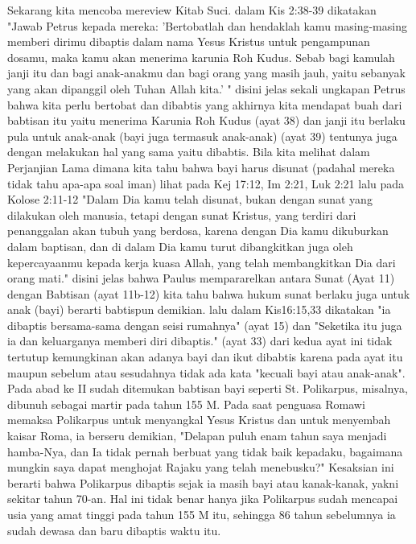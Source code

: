         Sekarang kita mencoba mereview Kitab Suci. dalam Kis 2:38-39 dikatakan "Jawab Petrus kepada mereka: 'Bertobatlah dan hendaklah kamu masing-masing memberi dirimu dibaptis dalam nama Yesus Kristus untuk pengampunan dosamu, maka kamu akan menerima karunia Roh Kudus. Sebab bagi kamulah janji itu dan bagi anak-anakmu dan bagi orang yang masih jauh, yaitu sebanyak yang akan dipanggil oleh Tuhan Allah kita.' " disini jelas sekali ungkapan Petrus bahwa kita perlu bertobat dan dibabtis yang akhirnya kita mendapat buah dari babtisan itu yaitu menerima Karunia Roh Kudus (ayat 38) dan janji itu berlaku pula untuk anak-anak (bayi juga termasuk anak-anak) (ayat 39) tentunya juga dengan melakukan hal yang sama yaitu dibabtis. Bila kita melihat dalam Perjanjian Lama dimana kita tahu bahwa bayi harus disunat (padahal mereka tidak tahu apa-apa soal iman) lihat pada Kej 17:12, Im 2:21, Luk 2:21 lalu pada Kolose 2:11-12 "Dalam Dia kamu telah disunat, bukan dengan sunat yang dilakukan oleh manusia, tetapi dengan sunat Kristus, yang terdiri dari penanggalan akan tubuh yang berdosa,  karena dengan Dia kamu dikuburkan dalam baptisan, dan di dalam Dia kamu turut dibangkitkan juga oleh kepercayaanmu kepada kerja kuasa Allah, yang telah membangkitkan Dia dari orang mati." disini jelas bahwa Paulus mempararelkan antara Sunat (Ayat 11) dengan Babtisan (ayat 11b-12) kita tahu bahwa hukum sunat berlaku juga untuk anak (bayi) berarti babtispun demikian. lalu dalam Kis16:15,33 dikatakan "ia dibaptis bersama-sama dengan seisi rumahnya" (ayat 15) dan "Seketika itu juga ia dan keluarganya memberi diri dibaptis." (ayat 33) dari kedua ayat ini tidak tertutup kemungkinan akan adanya bayi dan ikut dibabtis karena pada ayat itu maupun sebelum atau sesudahnya tidak ada kata "kecuali bayi atau anak-anak". Pada abad ke II sudah ditemukan babtisan bayi seperti St. Polikarpus, misalnya, dibunuh sebagai martir pada tahun 155 M. Pada saat penguasa Romawi memaksa Polikarpus untuk menyangkal Yesus Kristus dan untuk menyembah kaisar Roma, ia berseru demikian, "Delapan puluh enam tahun saya menjadi hamba-Nya, dan Ia tidak pernah berbuat yang tidak baik kepadaku, bagaimana mungkin saya dapat menghojat Rajaku yang telah menebusku?" Kesaksian ini berarti bahwa Polikarpus dibaptis sejak ia masih bayi atau kanak-kanak, yakni sekitar tahun 70-an. Hal ini tidak benar hanya jika Polikarpus sudah mencapai usia yang amat tinggi pada tahun 155 M itu, sehingga 86 tahun sebelumnya ia sudah dewasa dan baru dibaptis waktu itu.
 


